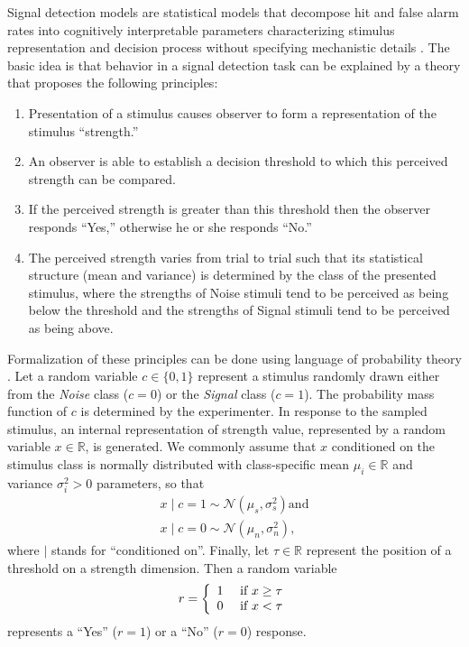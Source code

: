 \documentclass[12pt]{report}
\begin{document}
Signal detection models are statistical models that decompose hit and false alarm rates into cognitively interpretable parameters characterizing stimulus representation and decision process without specifying mechanistic details
\citep{MacCre2004,LeeWag2014}. The basic idea is that behavior in a
signal detection task can be explained by a theory that
proposes the following principles:
\begin{enumerate}
\item Presentation of a stimulus causes observer to form a  representation of the stimulus ``strength.''  
\item An observer is able to establish a decision threshold to which this perceived strength can be compared.  
\item If the perceived strength is greater than this threshold then the 
      observer responds ``Yes,'' otherwise he or she responds ``No.''  
\item The perceived strength varies from trial to trial such that its statistical structure (mean and 
      variance) is determined by the class of the presented stimulus, where the strengths of Noise stimuli tend to be perceived as being below 
      the threshold and the strengths of Signal stimuli tend to be perceived 
      as being above.  
\end{enumerate} 

Formalization of these principles can be done using language of probability theory \citep{CasBer2002}. Let a random variable $c \in \{0, 1\}$ represent a stimulus
randomly drawn either from the \textit{Noise} class ($c = 0$) or
the \textit{Signal} class ($c = 1$). The probability mass function of
$c$ is determined by the experimenter. In response to the sampled
stimulus, an internal representation of strength value, represented
by a random variable $x \in \mathbb{R}$, is generated. We commonly
assume that $x$ conditioned on the stimulus class is normally
distributed with class-specific mean $\mu_i \in \mathbb{R}$ and variance $\sigma_i^2 > 0$ parameters, so that
%
\begin{align}
x \mid c = 1 \sim \mathcal{N}(\mu_s, \sigma_s^2) \text{and} \nonumber \\
x \mid c = 0 \sim \mathcal{N}(\mu_n, \sigma_n^2),
\end{align}
% 
where $\mid$ stands for ``conditioned on''.
Finally, let $\tau \in \mathbb{R}$ represent the position of a threshold on a strength dimension. Then a random variable
%
\begin{equation}
r = \left\{
	\begin{array}{l l}
     1 & \text{ if } x \geq \tau\\
     0 & \text{ if } x < \tau
     \end{array}\right.
\end{equation}
%
represents a ``Yes'' ($r=1$) or a ``No'' ($r=0$) response.
\end{document}
